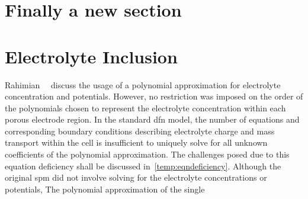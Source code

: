 
\section{Finally a new section}
\section{Electrolyte Inclusion}

Rahimian~\etal{}~\cite{KhaleghiRahimian2013}  discuss  the  usage  of  a
polynomial approximation for electrolyte  concentration and potentials. However,
no restriction was  imposed on the order of the  polynomials chosen to represent
the  electrolyte  concentration within  each  porous  electrode region.  In  the
standard \gls{dfn}  model, the  number of  equations and  corresponding boundary
conditions describing electrolyte  charge and mass transport within  the cell is
insufficient to  uniquely solve for  all unknown coefficients of  the polynomial
approximation.  The  challenges posed  due  to  this equation  deficiency  shall
be  discussed  in~\cref{temp:eqndeficiency}.
Although  the original  \gls{spm} did  not involve  solving for  the electrolyte
concentrations or potentials, The polynomial approximation of the single



